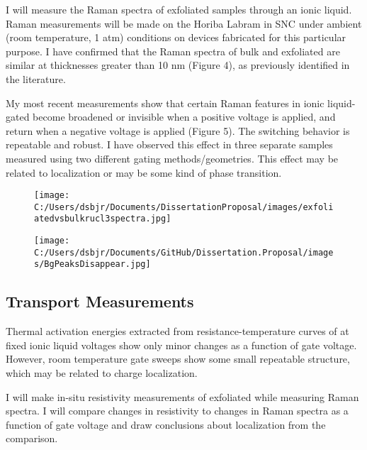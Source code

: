 \documentclass[11pt]{article}
\begin{document}
I will measure the Raman spectra of exfoliated \rucl samples through an ionic liquid. Raman measurements will be made on the Horiba Labram in SNC under ambient (room temperature, 1 atm) conditions on devices fabricated for this particular purpose. I have confirmed that the Raman spectra of bulk and exfoliated \rucl are similar at thicknesses greater than 10 nm (Figure 4), as previously identified in the literature.

My most recent measurements show that certain Raman features in ionic liquid-gated \rucl become broadened or invisible when a positive voltage is applied, and return when a negative voltage is applied (Figure 5). The switching behavior is repeatable and robust. I have observed this effect in three separate samples measured using two different gating methods/geometries. This effect may be related to localization or may be some kind of phase transition.

\begin{figure}
\centering
\begin{minipage}{0.5\textwidth}
\centering
	{\texttt{[image: C:/Users/dsbjr/Documents/DissertationProposal/images/exfoliatedvsbulkrucl3spectra.jpg]}\label{fig:f4}}
  \captionsetup{width=0.9\textwidth}
\end{minipage}%
\begin{minipage}{0.5\textwidth}
\centering 
  {\texttt{[image: C:/Users/dsbjr/Documents/GitHub/Dissertation.Proposal/images/BgPeaksDisappear.jpg]}\label{fig:f5}}
  \captionsetup{width=0.9\textwidth}
\end{minipage}
\end{figure}

\subsection{Transport Measurements}

Thermal activation energies extracted from resistance-temperature curves of \rucl at fixed ionic liquid voltages show only minor changes as a function of gate voltage. However, room temperature gate sweeps show some small repeatable structure, which may be related to charge localization.

I will make in-situ resistivity measurements of exfoliated \rucl while measuring Raman spectra. I will compare changes in resistivity to changes in Raman spectra as a function of gate voltage and draw conclusions about localization from the comparison.
\end{document}
